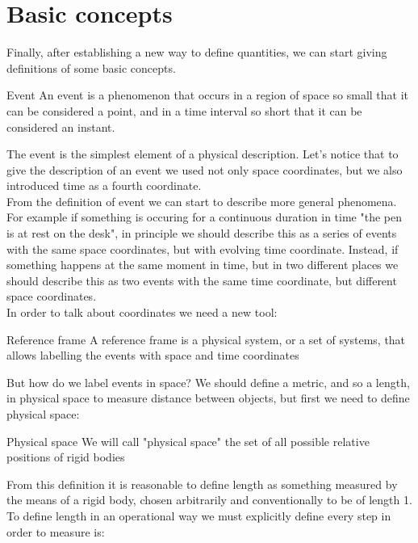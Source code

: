 \section{Basic concepts}
Finally, after establishing a new way to define quantities, we can start giving definitions of some basic concepts.
\begin{definition}{Event}
  An event is a phenomenon that occurs in a region of space so small that it can be considered a point, and in a time interval so short that it can be considered an instant.
\end{definition}
The event is the simplest element of a physical description. Let's notice that to give the description of an event we used not only space coordinates, but we also introduced time as a fourth coordinate.\\
From the definition of event we can start to describe more general phenomena. For example if something is occuring for a continuous duration in time "the pen is at rest on the desk", in principle we should describe this as a series of events with the same space coordinates, but with evolving time coordinate. Instead, if something happens at the same moment in time, but in two different places we should describe this as two events with the same time coordinate, but different space coordinates.\\
In order to talk about coordinates we need a new tool:
\begin{definition}{Reference frame}
  A reference frame is a physical system, or a set of systems, that allows labelling the events with space and time coordinates
\end{definition}
But how do we label events in space? We should define a metric, and so a length, in physical space to measure distance between objects, but first we need to define physical space:
\begin{definition}{Physical space}
  We will call "physical space" the set of all possible relative positions of rigid bodies
\end{definition}
From this definition it is reasonable to define length as something measured by the means of a rigid body, chosen arbitrarily and conventionally to be of length 1. To define length in an operational way we must explicitly define every step in order to measure is:
